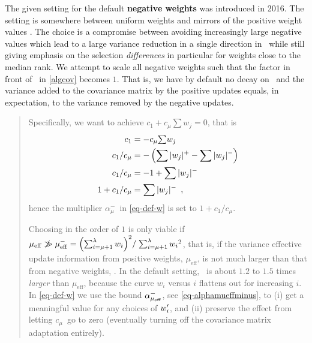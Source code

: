\documentclass{article} %
\newenvironment{einschub}{%
\begin{small} \begin{quotation}\noindent}{%
  \vspace{0.5ex}\end{quotation}\end{small}%
}
\newcommand{\auge}[1]{\textbf{#1}}
\newcommand{\mueff}{\ensuremath{\mu_\mathrm{eff}}}
\newcommand{\sumw}[1][j]{\ensuremath{{\textstyle\sum{\!w_{#1}}}}}
\newcommand{\alphamuminus}{\ensuremath{\alpha_{\mu}^{-}}}
\newcommand{\lam}{\ensuremath{\lambda}}
\newcommand{\cone}{\ensuremath{c_1}}
\newcommand{\cmu}{\ensuremath{c_\mu}}
\begin{document}
\begin{appendix}
  The given setting for the default \auge{negative weights} was introduced in 2016. 
  The setting is somewhere between uniform weights \cite{jastrebski2006improving} 
  and mirrors of the positive weight values \cite{arnold2006weighted,hansen2010benchmarking}. 
  The choice is a compromise between avoiding increasingly large negative values which lead to a large variance reduction in a single direction in \C\ while still giving emphasis on the selection \emph{differences} in particular for weights close to the median rank. We attempt to scale all negative weights such that the factor in front of \C\ in \eqref{algcov} becomes $1$. That is, we have by default no decay on \C\ and the variance added to the covariance matrix by the positive updates equals, in expectation, to the variance removed by the negative updates. 

\begin{einschub}%
%
  Specifically, we want to achieve $\cone+\cmu\sumw=0$, 
  that is 
  \begin{align*}
  \cone & = -\cmu\sumw \\ 
  \cone/\cmu &= -\left(\possum{w_j} - \negsum{w_j}\right) \\
  \cone/\cmu &= -1 + \negsum{w_j} \\
  1 + \cone/\cmu &= \negsum{w_j} \enspace,   
  \end{align*}
  hence the
  multiplier \alphamuminus\ in \eqref{eq-def-w} is set to $1 + \cone / \cmu$. 

  Choosing  in the order of $1$ is only viable if $\mueff\not\gg \mueffminus = {\left(\sum_{i=\mu+1}^\lam w_i\right)^2} / \;{\sum_{i=\mu+1}^\lam {w_i}^2}$, that is, if the variance effective update information from positive weights, \mueff, is not much larger than that from negative weights, \mueffminus. In the default setting, \mueffminus\ is about $1.2$ to $1.5$ times \emph{larger} than $\mueff$, because the curve $w_i$ versus $i$ flattens out for increasing $i$. In \eqref{eq-def-w} we use the bound $\alphamueffminus$, see \eqref{eq-alphamueffminus}, to (i) get a meaningful value for any choices of $w_i'$, and (ii) preserve the effect from letting \cmu\ go to zero (eventually turning off the covariance matrix adaptation entirely).


\end{einschub}
\end{appendix}
\end{document}
